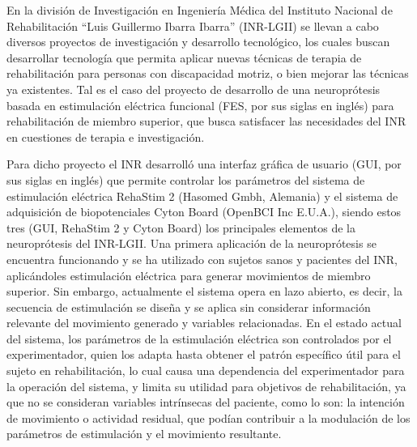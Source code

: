 
En la división de Investigación en Ingeniería Médica del Instituto Nacional de Rehabilitación ``Luis Guillermo Ibarra Ibarra'' (INR-LGII) se llevan a cabo diversos proyectos de investigación y desarrollo tecnológico, los cuales buscan desarrollar tecnología que permita aplicar nuevas técnicas de terapia de rehabilitación para personas con discapacidad motriz, o bien mejorar las técnicas ya existentes. Tal es el caso del proyecto de desarrollo de una neuroprótesis basada en estimulación eléctrica funcional (FES, por sus siglas en inglés) para rehabilitación de miembro superior, que busca satisfacer las necesidades del INR en cuestiones de terapia e investigación.

Para dicho proyecto el INR desarrolló una interfaz gráfica de usuario (GUI, por sus siglas en inglés) que permite controlar los parámetros del sistema de estimulación eléctrica RehaStim 2 (Hasomed Gmbh, Alemania) y el sistema de adquisición de biopotenciales Cyton Board (OpenBCI Inc E.U.A.), siendo estos tres (GUI, RehaStim 2 y Cyton Board) los principales elementos de la neuroprótesis del INR-LGII. Una primera aplicación de la neuroprótesis se encuentra funcionando y se ha utilizado con sujetos sanos y pacientes del INR, aplicándoles estimulación eléctrica para generar movimientos de miembro superior. Sin embargo, actualmente el sistema opera en lazo abierto, es decir, la secuencia de estimulación se diseña y se aplica sin considerar información relevante del movimiento generado y variables relacionadas. En el estado actual del sistema, los parámetros de la estimulación eléctrica son controlados por el experimentador, quien los adapta hasta obtener el patrón específico útil para el sujeto en rehabilitación, lo cual causa una dependencia del experimentador para la operación del sistema, y limita su utilidad para objetivos de rehabilitación, ya que no se consideran variables intrínsecas del paciente, como lo son: la intención de movimiento o actividad residual, que podían contribuir a la modulación de los parámetros de estimulación y el movimiento resultante.


